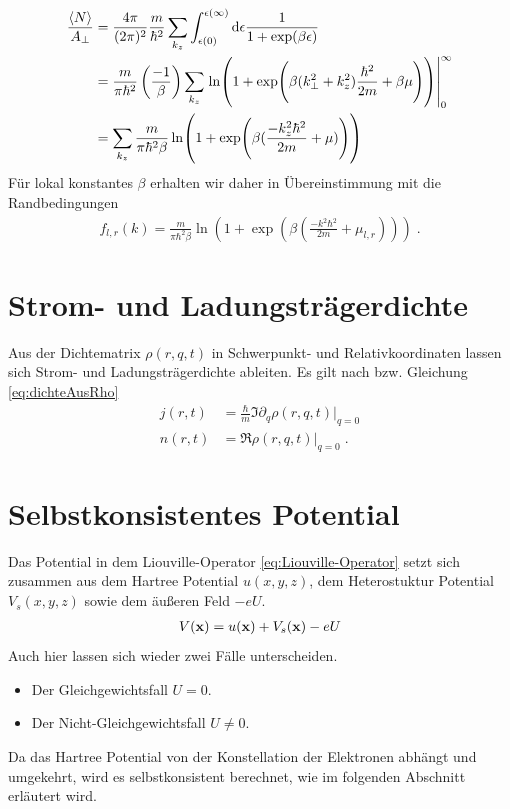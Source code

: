 \begin{align}
  \frac{\expval{N}}{A_{\perp}} &= \frac{4\pi}{(2\pi)^2} \frac{m}{\hbar^2} \sum_{k_z} \int_{\epsilon(0)}^{{\epsilon(\infty)}} \mathop{}\!\mathrm{d} \epsilon \frac{1}{1+\exp(\beta\epsilon)} \\
    &= \frac{m}{\pi\hbar^2}\left( \frac{-1}{\beta}\right) \sum_{k_z} \left.\ln(1+\exp(\beta(k_{\perp}^2 + k_z^2)\frac{\hbar^2}{2m} + \beta\mu))\right|_0^{\infty} \\
    &= \sum_{k_z} \frac{m}{\pi\hbar^2\beta} \ln(1+\exp(\beta(\frac{- k_z^2\hbar^2}{2m} + \mu)))
\end{align}
Für lokal konstantes $\beta$ erhalten wir daher in Übereinstimmung mit \cite{frensley2} die Randbedingungen
\begin{align}
  f_{l,r} (k) = \frac{m}{\pi\hbar^2\beta} \ln(1+\exp(\beta(\frac{- k^2\hbar^2}{2m} + \mu_{l,r}))) \; .
\end{align}


\section{Strom- und Ladungsträgerdichte}
Aus der Dichtematrix $\rho(r,q,t)$ in Schwerpunkt- und Relativkoordinaten lassen sich Strom- und Ladungsträgerdichte ableiten. Es gilt nach \cite{lukas1} bzw. Gleichung \eqref{eq:dichteAusRho}
\begin{align}
  j(r,t) &= \frac{\hbar}{m}\Im{\partial_q \rho(r,q,t)|_{q=0}} \\
  n(r,t) &= \Re{\rho(r,q,t)|_{q=0}} \; .
  \label{eq:dichte}
\end{align}

\section{Selbstkonsistentes Potential}
Das Potential in dem Liouville-Operator \eqref{eq:Liouville-Operator} setzt sich zusammen aus dem Hartree Potential $u(x,y,z)$, dem Heterostuktur Potential $V_s(x,y,z)$ sowie dem äußeren Feld $-eU$.
\begin{align}
  V(\vb{x}) = u(\vb{x}) + V_s(\vb{x}) - eU
\end{align}
Auch hier lassen sich wieder zwei Fälle unterscheiden.
\begin{itemize}
  \item Der Gleichgewichtsfall $U=0$. %
  \item Der Nicht-Gleichgewichtsfall $U\neq 0$. %
\end{itemize}
Da das Hartree Potential von der Konstellation der Elektronen abhängt und umgekehrt, wird es selbstkonsistent berechnet, wie im folgenden Abschnitt erläutert wird.

